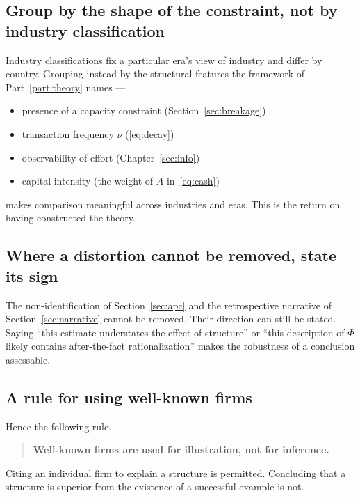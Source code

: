 \subsection{Group by the shape of the constraint, not by industry classification}

Industry classifications fix a particular era's view of industry and differ by country.
Grouping instead by the structural features the framework of Part~\ref{part:theory} names ---
\begin{itemize}
\item presence of a capacity constraint (Section~\ref{sec:breakage})
\item transaction frequency $\nu$ (\eqref{eq:decay})
\item observability of effort (Chapter~\ref{sec:info})
\item capital intensity (the weight of $A$ in~\eqref{eq:cash})
\end{itemize}
makes comparison meaningful across industries and eras. This is the return on having
constructed the theory.

\subsection{Where a distortion cannot be removed, state its sign}

The non-identification of Section~\ref{sec:apc} and the retrospective narrative of
Section~\ref{sec:narrative} cannot be removed. Their direction can still be stated. Saying
``this estimate understates the effect of structure'' or ``this description of $\Phi$ likely
contains after-the-fact rationalization'' makes the robustness of a conclusion assessable.

\subsection{A rule for using well-known firms}

Hence the following rule.
\begin{quote}
\textbf{Well-known firms are used for illustration, not for inference.}
\end{quote}
Citing an individual firm to explain a structure is permitted. Concluding that a structure is
superior from the existence of a successful example is not.


